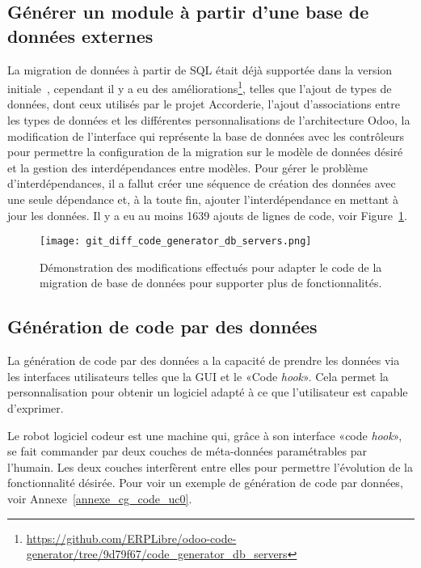 \subsection{Générer un module à partir d’une base de données externes}


La migration de données à partir de SQL était déjà supportée dans la version initiale~\cite{bluiksnot_repo}, cependant il y a eu des améliorations\footnote{\url{https://github.com/ERPLibre/odoo-code-generator/tree/9d79f67/code_generator_db_servers}}, telles que l'ajout de types de données, dont ceux utilisés par le projet Accorderie, l'ajout d'associations entre les types de données et les différentes personnalisations de l’architecture Odoo, la modification de l'interface qui représente la base de données avec les contrôleurs pour permettre la configuration de la migration sur le modèle de données désiré et la gestion des interdépendances entre modèles. Pour gérer le problème d'interdépendances, il a fallut créer une séquence de création des données avec une seule dépendance et, à la toute fin, ajouter l'interdépendance en mettant à jour les données. Il y a eu au moins 1639 ajouts de lignes de code, voir Figure~\ref{fig:dia_cg_db_servers}.

\begin{figure}[htb]
\centering
\texttt{[image: git\_diff\_code\_generator\_db\_servers.png]}
\caption{Démonstration des modifications effectués pour adapter le code de la migration de base de données pour supporter plus de fonctionnalités.}
\label{fig:dia_cg_db_servers}
\end{figure}

\subsection{Génération de code par des données}

La génération de code par des données a la capacité de prendre les données via les interfaces utilisateurs telles que la GUI et le «Code \textit{hook}». Cela permet la personnalisation pour obtenir un logiciel adapté à ce que l’utilisateur est capable d’exprimer.

Le robot logiciel codeur est une machine qui, grâce à son interface «code \textit{hook}», se fait commander par deux couches de méta-données paramétrables par l’humain. Les deux couches interfèrent entre elles pour permettre l’évolution de la fonctionnalité désirée. Pour voir un exemple de génération de code par données, voir Annexe~\ref{annexe_cg_code_uc0}.

